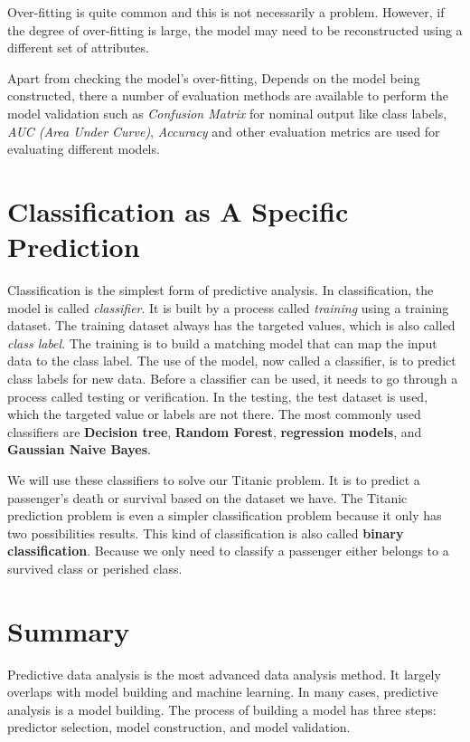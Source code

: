 \documentclass[
]{book}
\begin{document}
Over-fitting is quite common and this is not necessarily a problem. However, if the degree of over-fitting is large, the model may need to be reconstructed using a different set of attributes.

Apart from checking the model's over-fitting, Depends on the model being constructed, there a number of evaluation methods are available to perform the model validation such as \emph{Confusion Matrix} for nominal output like class labels, \emph{AUC (Area Under Curve)}, \emph{Accuracy} and other evaluation metrics are used for evaluating different models.

\hypertarget{classification-as-a-specific-prediction}{%
\section{Classification as A Specific Prediction}\label{classification-as-a-specific-prediction}}

Classification is the simplest form of predictive analysis. In classification, the model is called \emph{classifier}. It is built by a process called \emph{training} using a training dataset. The training dataset always has the targeted values, which is also called \emph{class label}. The training is to build a matching model that can map the input data to the class label. The use of the model, now called a classifier, is to predict class labels for new data. Before a classifier can be used, it needs to go through a process called testing or verification. In the testing, the test dataset is used, which the targeted value or labels are not there. The most commonly used classifiers are \textbf{Decision tree}, \textbf{Random Forest}, \textbf{regression models}, and \textbf{Gaussian Naive Bayes}.

We will use these classifiers to solve our Titanic problem. It is to predict a passenger's death or survival based on the dataset we have. The Titanic prediction problem is even a simpler classification problem because it only has two possibilities results. This kind of classification is also called \textbf{binary classification}. Because we only need to classify a passenger either belongs to a survived class or perished class.

\hypertarget{summary-4}{%
\section*{Summary}\label{summary-4}}


Predictive data analysis is the most advanced data analysis method. It largely overlaps with model building and machine learning. In many cases, predictive analysis is a model building. The process of building a model has three steps: predictor selection, model construction, and model validation.
\end{document}
